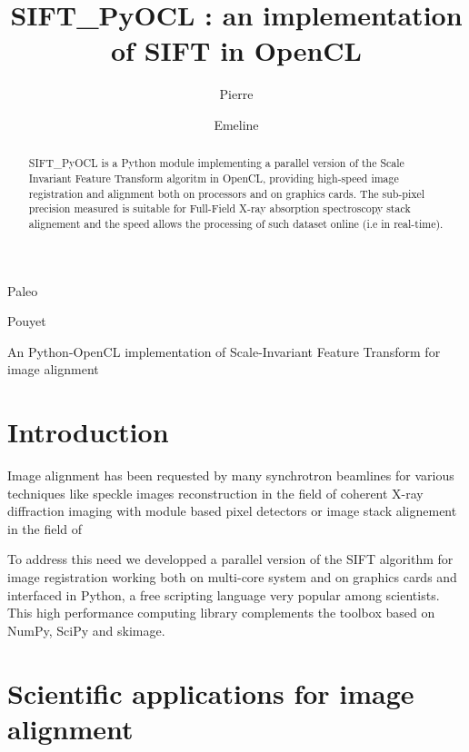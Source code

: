 \documentclass[preprint]{iucr}
\begin{document}
\title{SIFT\_PyOCL : an implementation of SIFT in OpenCL}

    \author[a]{Pierre}{Paleo}
    \author[a]{Emeline}{Pouyet}

\maketitle

\begin{synopsis}
An Python-OpenCL implementation of Scale-Invariant Feature Transform for image
alignment
\end{synopsis}

\begin{abstract}
SIFT\_PyOCL is a Python module implementing a parallel version of the Scale
Invariant Feature Transform algoritm in OpenCL, providing high-speed image
registration and alignment both on processors and on graphics cards. 
The sub-pixel precision measured is suitable for Full-Field X-ray
absorption spectroscopy stack alignement and the speed allows the processing of
such dataset online (i.e in real-time).
 
\end{abstract}

\section{Introduction}

Image alignment has been requested by many synchrotron beamlines for
various techniques like speckle images reconstruction in the field of coherent
X-ray diffraction imaging with module based pixel detectors or image stack
alignement in the field of  

 To address this need we developped a parallel
version of the SIFT algorithm for image registration working both on multi-core system and on graphics cards
and interfaced in Python, a free scripting language very popular among
scientists. This high performance computing library complements the toolbox
based on NumPy\cite{numpy}, SciPy\cite{scipy} and skimage\cite{skimage}. 


\section{Scientific applications for image alignment}
\end{document}
